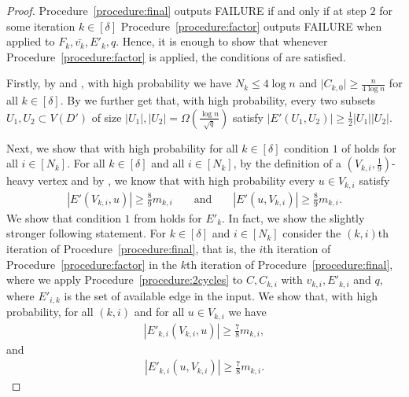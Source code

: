 \documentclass{article}
\begin{document}
	\begin{proof}
		Procedure~\ref{procedure:final} outputs FAILURE if and only if at step $2$ for some iteration $k \in [\delta]$ Procedure~\ref{procedure:factor} outputs FAILURE when applied to $F_k, \bar{v_k}, E'_k, q$.
		Hence, it is enough to show that whenever Procedure~\ref{procedure:factor} is applied, the conditions of  are satisfied.
		
		Firstly, by  and , with high probability we have $N_k \le 4\log n$ and $\big|C_{k,0} \big| \ge \frac{n}{4\log n}$ for all $k \in [\delta]$.
		By  we further get that, with high probability, every two subsets $U_1, U_2 \subset V(D')$ of size $|U_1|, |U_2| = \Omega\left(\frac{\log n}{\sqrt{q}} \right)$ satisfy $\left|E'(U_1, U_2) \right| \ge \frac{1}{2}|U_1||U_2|$.
		
		Next, we show that with high probability for all $k \in [\delta]$ condition $1$ of  holds for all $i \in [N_k]$.
		For all $k \in [\delta]$ and all $i \in [N_k]$, by the definition of a $\left(V_{k,i}, \frac{1}{9} \right)$-heavy vertex and by , we know that with high probability every $u \in V_{k,i}$ satisfy
		\begin{align}
		\label{eq:E11u}
		\left|E'\left(V_{k,i}, u \right) \right| \ge \tfrac{8}{9}m_{k,i} && \text{ and } && \left|E'\left(u, V_{k,i} \right) \right| \ge \tfrac{8}{9}m_{k,i}.
		\end{align}
		We show that condition $1$ from  holds for $E'_k$.
		In fact, we show the slightly stronger following statement.
		For $k \in [\delta]$ and $i \in [N_k]$ consider the $(k,i)$th iteration of Procedure~\ref{procedure:final}, that is, the $i$th iteration of Procedure~\ref{procedure:factor} in the $k$th iteration of Procedure~\ref{procedure:final}, where we apply Procedure~\ref{procedure:2cycles} to $C, C_{k,i}$ with $v_{k,i}, E'_{k,i}$ and $q$, where $E'_{i,k}$ is the set of available edge in the input.
		We show that, with high probability, for all $(k,i)$ and for all $u \in V_{k,i}$ we have
		\begin{align}
		\label{eq:inEkiu}
		\left|E'_{k,i}\left(V_{k,i}, u \right) \right| \ge \tfrac{7}{8}m_{k,i}, 
		\end{align}
		and
		\begin{align}
		\label{eq:outEkiu}
		\left|E'_{k,i}\left(u, V_{k,i} \right) \right| \ge \tfrac{7}{8}m_{k,i}.
		\end{align}
		

\end{proof}
\end{document}
